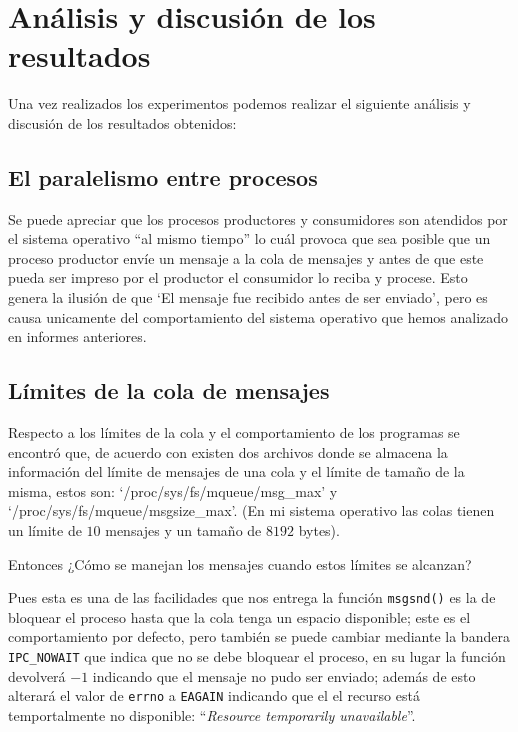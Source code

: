 \section{Análisis y discusión de los resultados}
Una vez realizados los experimentos podemos realizar el siguiente análisis y discusión de los resultados obtenidos:

\subsection{El paralelismo entre procesos}
Se puede apreciar que los procesos productores y consumidores son atendidos por el sistema operativo ``al mismo tiempo'' lo cuál provoca que sea posible que un proceso productor envíe un mensaje a la cola de mensajes y antes de que este pueda ser impreso por el productor el consumidor lo reciba y procese. Esto genera la ilusión de que `El mensaje fue recibido antes de ser enviado', pero es causa unicamente del comportamiento del sistema operativo que hemos analizado en informes anteriores.
\subsection{Límites de la cola de mensajes}
Respecto a los límites de la cola y el comportamiento de los programas se encontró que, de acuerdo con \textcite{colasLinux} existen dos archivos donde se almacena la información del límite de mensajes de una cola y el límite de tamaño de la misma, estos son: `/proc/sys/fs/mqueue/msg\_max' y `/proc/sys/fs/mqueue/msgsize\_max'. (En mi sistema operativo las colas tienen un límite de $10$ mensajes y un tamaño de $8192$ bytes).

Entonces ¿Cómo se manejan los mensajes cuando estos límites se alcanzan?

Pues esta es una de las facilidades que nos entrega la función \texttt{msgsnd()} es la de bloquear el proceso hasta que la cola tenga un espacio disponible; este es el comportamiento por defecto, pero también se puede cambiar mediante la bandera \texttt{IPC\_NOWAIT} que indica que no se debe bloquear el proceso, en su lugar la función devolverá $-1$ indicando que el mensaje no pudo ser enviado; además de esto alterará el valor de \texttt{errno} a \texttt{EAGAIN} indicando que el el recurso está temportalmente no disponible: ``\textit{Resource temporarily unavailable}''.


